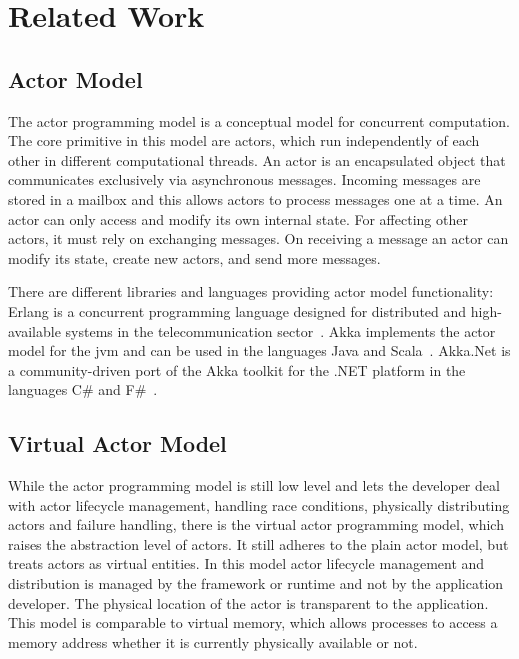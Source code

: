 
\section{Related Work}

  \subsection{Actor Model}
  The actor programming model is a conceptual model for concurrent computation.
  The core primitive in this model are actors, which run independently of each other in different computational threads.
  An actor is an encapsulated object that communicates exclusively via asynchronous messages.
  Incoming messages are stored in a mailbox and this allows actors to process messages one at a time.
  An actor can only access and modify its own internal state.
  For affecting other actors, it must rely on exchanging messages.
  On receiving a message an actor can modify its state, create new actors, and send more messages.

  There are different libraries and languages providing actor model functionality:
  Erlang is a concurrent programming language designed for distributed and high-available systems in the telecommunication sector~\cite{armstrong:erlang}.
  Akka implements the actor model for the \gls{jvm} and can be used in the languages Java and Scala~\cite{akka}.
  Akka.Net is a community-driven port of the Akka toolkit for the .NET platform in the languages C\# and F\#~\cite{akka.net}.

  \subsection{Virtual Actor Model}
  While the actor programming model is still low level and lets the developer deal with actor lifecycle management, handling race conditions, physically distributing actors and failure handling, there is the virtual actor programming model, which raises the abstraction level of actors.
  It still adheres to the plain actor model, but treats actors as virtual entities.
  In this model actor lifecycle management and distribution is managed by the framework or runtime and not by the application developer.
  The physical location of the actor is transparent to the application.
  This model is comparable to virtual memory, which allows processes to access a memory address whether it is currently physically available or not.
  
